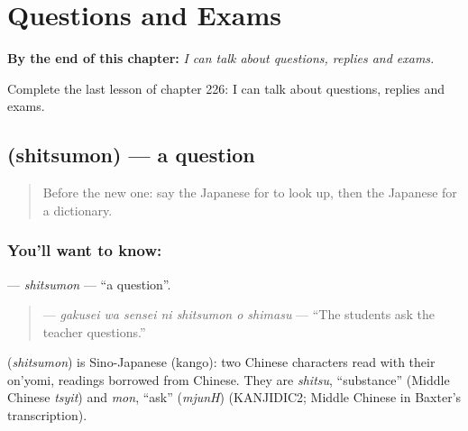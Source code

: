 
\chapter{Questions and Exams}
\label{ch:ja-questions-and-exams}

\begin{chapteropening}
\textbf{By the end of this chapter:} \emph{I can talk about questions, replies and exams.}

Complete the last lesson of chapter 226: I can talk about questions, replies and exams.
\end{chapteropening}

\section[\texorpdfstring{\ja{しつもん} (shitsumon)}{しつもん (shitsumon)}]{ (shitsumon) — a question}

\label{lesson:JA-C226-shitsumon}



\begin{quote}
Before the new one: say the Japanese for to look up, then the Japanese for a dictionary.
\end{quote}

\subsection*{You'll want to know: }
\textbf{} — \emph{shitsumon} — \textquotedblleft{}a question\textquotedblright{}.

\begin{quote}
\textbf{   } — \emph{gakusei wa sensei ni shitsumon o shimasu} — \textquotedblleft{}The students ask the teacher questions.\textquotedblright{}
\end{quote}

\begin{cousinweb}
\textbf{} (\emph{shitsumon}) is Sino-Japanese (kango): two Chinese characters read with their on'yomi, readings borrowed from Chinese. They are \emph{shitsu}, \textquotedblleft{}substance\textquotedblright{} (Middle Chinese \emph{tsyit}) and \emph{mon}, \textquotedblleft{}ask\textquotedblright{} (\emph{mjunH}) (KANJIDIC2; Middle Chinese in Baxter's transcription).
\end{cousinweb}

